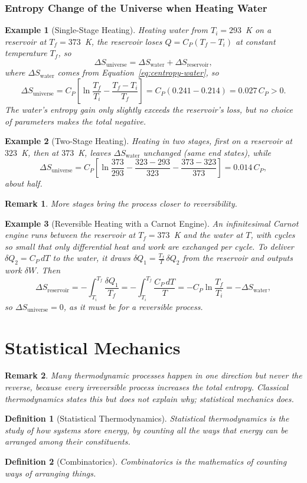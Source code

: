 \documentclass{article}
\newtheorem{definition}{Definition}
\newtheorem{example}{Example}
\newtheorem{remark}{Remark}
\begin{document}
\subsubsection{Entropy Change of the Universe when Heating Water}
\begin{example}[Single-Stage Heating]
    Heating water from $T_i = 293$~K on a reservoir at $T_f = 373$~K, the reservoir loses $Q = C_P(T_f - T_i)$ at constant temperature $T_f$, so
    \[\Delta S_{\text{universe}} = \Delta S_{\text{water}} + \Delta S_{\text{reservoir}},\]
    where $\Delta S_{\text{water}}$ comes from Equation~\eqref{eq:centropy-water}, so
    \[\Delta S_{\text{universe}} = C_P\left[\ln\frac{T_f}{T_i} - \frac{T_f - T_i}{T_f}\right] = C_P(0.241 - 0.214) = 0.027\,C_P > 0.\]
    The water's entropy gain only slightly exceeds the reservoir's loss, but no choice of parameters makes the total negative.
\end{example}
\begin{example}[Two-Stage Heating]
    Heating in two stages, first on a reservoir at $323$~K, then at $373$~K, leaves $\Delta S_{\text{water}}$ unchanged (same end states), while
    \[\Delta S_{\text{universe}} = C_P\left[\ln\frac{373}{293} - \frac{323-293}{323} - \frac{373-323}{373}\right] = 0.014\,C_P,\]
    about half.
\end{example}
\begin{remark}
    More stages bring the process closer to reversibility.
\end{remark}
\begin{example}[Reversible Heating with a Carnot Engine]
    An infinitesimal Carnot engine runs between the reservoir at $T_f = 373$~K and the water at $T$, with cycles so small that only differential heat and work are exchanged per cycle. To deliver $\delta Q_2 = C_P\,dT$ to the water, it draws $\delta Q_1 = \frac{T_f}{T}\,\delta Q_2$ from the reservoir and outputs work $\delta W$. Then
    \[\Delta S_{\text{reservoir}} = -\int_{T_i}^{T_f}\frac{\delta Q_1}{T_f} = -\int_{T_i}^{T_f}\frac{C_P\,dT}{T} = -C_P\ln\frac{T_f}{T_i} = -\Delta S_{\text{water}},\]
    so $\Delta S_{\text{universe}} = 0$, as it must be for a reversible process.
\end{example}


\section{Statistical Mechanics}
\begin{remark}
    Many thermodynamic processes happen in one direction but never the reverse, because every irreversible process increases the total entropy. Classical thermodynamics states this but does not explain why; statistical mechanics does.
\end{remark}
\begin{definition}[Statistical Thermodynamics]
    Statistical thermodynamics is the study of how systems store energy, by counting all the ways that energy can be arranged among their constituents.
\end{definition}
\begin{definition}[Combinatorics]
    Combinatorics is the mathematics of counting ways of arranging things.
\end{definition}
\end{document}
